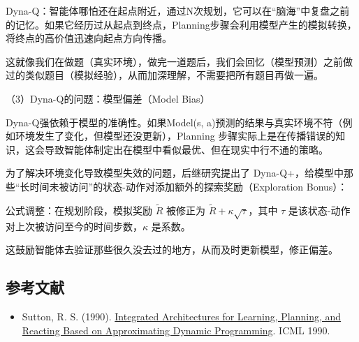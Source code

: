 Dyna-Q：智能体哪怕还在起点附近，通过N次规划，它可以在``脑海''中复盘之前的记忆。如果它经历过从起点到终点，Planning步骤会利用模型产生的模拟转换，将终点的高价值迅速向起点方向传播。

这就像我们在做题（真实环境），做完一道题后，我们会回忆（模型预测）之前做过的类似题目（模拟经验），从而加深理解，不需要把所有题目再做一遍。

（3）Dyna-Q的问题：模型偏差（Model Bias）

Dyna-Q强依赖于模型的准确性。如果Model(s, a)预测的结果与真实环境不符（例如环境发生了变化，但模型还没更新），Planning 步骤实际上是在传播错误的知识，这会导致智能体制定出在模型中看似最优、但在现实中行不通的策略。

为了解决环境变化导致模型失效的问题，后继研究提出了 Dyna-Q+，给模型中那些``长时间未被访问''的状态-动作对添加额外的探索奖励（Exploration Bonus）：

公式调整：在规划阶段，模拟奖励 \(\tilde{R}\) 被修正为 \(\tilde{R}+\kappa\sqrt{\tau}\)，其中 \(\tau\) 是该状态-动作对上次被访问至今的时间步数，\(\kappa\) 是系数。

这鼓励智能体去验证那些很久没去过的地方，从而及时更新模型，修正偏差。

\FloatBarrier
{}
\hypertarget{ux53c2ux8003ux6587ux732e-49}{%
\subsection{参考文献}\label{ux53c2ux8003ux6587ux732e-49}}

\vspace{0.25em}
\begin{itemize}
\tightlist
\item
  Sutton, R. S. (1990). \href{http://incompleteideas.net/papers/sutton-90.pdf}{Integrated Architectures for Learning, Planning, and Reacting Based on Approximating Dynamic Programming}. ICML 1990.
\end{itemize}

\clearpage
